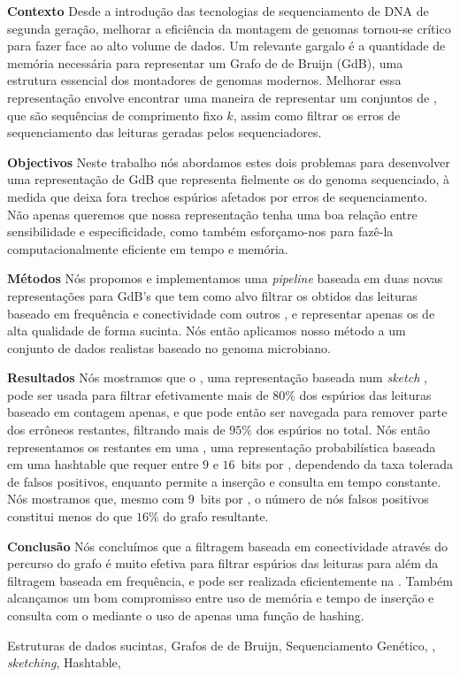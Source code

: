 \resumo

\textbf{Contexto} Desde a introdução das tecnologias de sequenciamento de DNA de segunda geração, melhorar a eficiência da montagem de genomas tornou-se crítico para fazer face ao alto volume de dados. Um relevante gargalo é a quantidade de memória necessária para representar um Grafo de de Bruijn (GdB), uma estrutura essencial dos montadores de genomas modernos. Melhorar essa representação envolve encontrar uma maneira de representar um conjuntos de \kmers, que são sequências de comprimento fixo $k$, assim como filtrar os erros de sequenciamento das leituras geradas pelos sequenciadores.

\noindent\textbf{Objectivos}  Neste trabalho nós abordamos estes dois problemas para desenvolver uma representação de GdB que representa fielmente os \kmers do genoma sequenciado, à medida que deixa fora trechos espúrios afetados por erros de sequenciamento. Não apenas queremos que nossa representação tenha uma boa relação entre sensibilidade e especificidade, como também esforçamo-nos para fazê-la computacionalmente eficiente em tempo e memória.

\noindent\textbf{Métodos} Nós propomos e implementamos uma \emph{pipeline} baseada em duas novas representações para GdB's que tem como alvo filtrar os  obtidos das leituras baseado em frequência e conectividade com outros , e representar apenas os  de alta qualidade de forma sucinta. Nós então aplicamos nosso método a um conjunto de dados realistas baseado no genoma microbiano.

\noindent\textbf{Resultados} Nós mostramos que o \dBCM, uma representação baseada num \emph{sketch} \cm, pode ser usada para filtrar efetivamente mais de $80\%$ dos  espúrios das leituras baseado em contagem apenas, e que pode então ser navegada para remover parte dos  errôneos restantes, filtrando mais de $95\%$ dos  espúrios no total. Nós então representamos os  restantes em uma \dBHT, uma representação probabilística baseada em uma hashtable que requer entre $9$ e $16$~bits por \kmer, dependendo da taxa tolerada de falsos positivos, enquanto permite a inserção e consulta em tempo constante. Nós mostramos que, mesmo com $9$~bits por \kmer, o número de nós falsos positivos constitui menos do que $16\%$ do grafo resultante.

\noindent\textbf{Conclusão} Nós concluímos que a filtragem baseada em conectividade através do percurso do grafo é muito efetiva para filtrar  espúrios das leituras para além da filtragem baseada em frequência, e pode ser realizada eficientemente na \dBCM. Também alcançamos um bom compromisso entre uso de memória e tempo de inserção e consulta com o \dBHT mediante o uso de apenas uma função de hashing.

\begin{keywords}
Estruturas de dados sucintas, Grafos de de Bruijn, Sequenciamento Genético, , \emph{sketching}, Hashtable, \cm
\end{keywords}